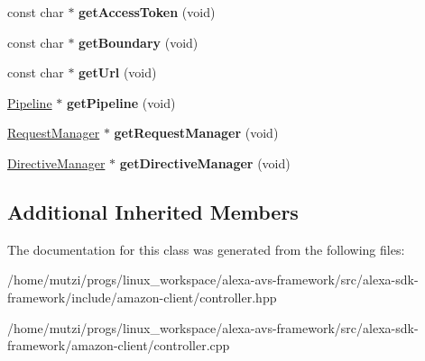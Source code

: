 \begin{DoxyCompactItemize}
\item 
\mbox{\label{classAVS_1_1Controller_abbacc18e34d4aaa4bd8a3645a81f87f6}} 
const char $\ast$ {\bfseries get\+Access\+Token} (void)
\item 
\mbox{\label{classAVS_1_1Controller_a89ed784bfce8805d7543c021e7715f91}} 
const char $\ast$ {\bfseries get\+Boundary} (void)
\item 
\mbox{\label{classAVS_1_1Controller_aa9d08dde0c534d06c161b3e3cabdec5b}} 
const char $\ast$ {\bfseries get\+Url} (void)
\item 
\mbox{\label{classAVS_1_1Controller_a4608ebd27c9e2d2099e0d3f31f342168}} 
\hyperlink{classAVS_1_1Pipeline}{Pipeline} $\ast$ {\bfseries get\+Pipeline} (void)
\item 
\mbox{\label{classAVS_1_1Controller_a63797ac8d60a79fa03e89d3745f04e3c}} 
\hyperlink{classAlexaEvent_1_1RequestManager}{Request\+Manager} $\ast$ {\bfseries get\+Request\+Manager} (void)
\item 
\mbox{\label{classAVS_1_1Controller_a555921f4353aa01717f2706cb8e6e73f}} 
\hyperlink{classdirective_1_1DirectiveManager}{Directive\+Manager} $\ast$ {\bfseries get\+Directive\+Manager} (void)
\end{DoxyCompactItemize}
\subsection*{Additional Inherited Members}


The documentation for this class was generated from the following files\+:\begin{DoxyCompactItemize}
\item 
/home/mutzi/progs/linux\+\_\+workspace/alexa-\/avs-\/framework/src/alexa-\/sdk-\/framework/include/amazon-\/client/controller.\+hpp\item 
/home/mutzi/progs/linux\+\_\+workspace/alexa-\/avs-\/framework/src/alexa-\/sdk-\/framework/amazon-\/client/controller.\+cpp\end{DoxyCompactItemize}
